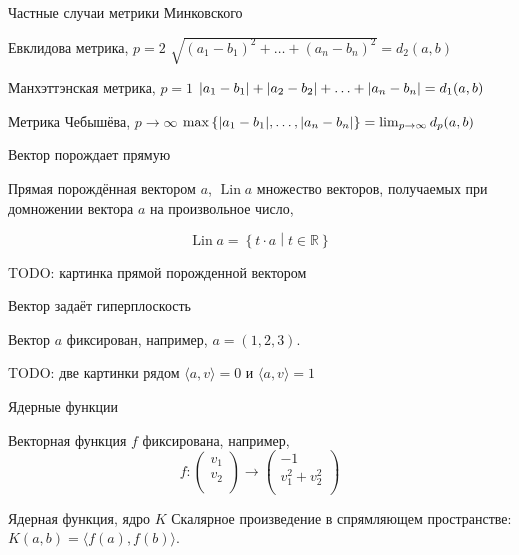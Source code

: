 \documentclass[14pt,xcolor=dvipsnames]{beamer}
\DeclareMathOperator{\Lin}{\mathrm{Lin}}
\newcommand\R{\mathbb{R}}
\begin{document}
\begin{frame}{Частные случаи метрики Минковского}

\begin{block}{Евклидова метрика, $p=2$}
$
  \sqrt{(a_1 - b_1)^2 + \ldots + (a_n - b_n)^2} = d_2(a, b)
$
\end{block}

\begin{block}{Манхэттэнская метрика, $p=1$}
$
    \abs{a_1 - b_1}  + \abs{a_2 - b_2} + \ldots + \abs{a_n - b_n} = d_1(a, b)
$
\end{block}
  
\begin{block}{Метрика Чебышёва, $p\to \infty$}
$
    \max\left\{\abs{a_1 - b_1}, \ldots, \abs{a_n - b_n}\right\} = \lim_{p\to\infty} d_p(a, b)
$
\end{block}
\end{frame}

\begin{frame}{Вектор порождает прямую}

\begin{block}{Прямая порождённая вектором $a$, $\Lin a$}
множество векторов, получаемых при домножении вектора $a$ на произвольное число,
\end{block}
\[
\Lin a = \left\{t\cdot a \middle| t \in \R \right\}  
\]

\begin{block}{TODO: картинка прямой порожденной вектором}
\end{block}

\end{frame}


\begin{frame}{Вектор задаёт гиперплоскость}

Вектор $a$ фиксирован, например, $a=(1, 2, 3)$.

\begin{block}{TODO: две картинки рядом}
$\langle a, v \rangle = 0$ и $\langle a, v \rangle = 1$   
\end{block}


\end{frame}


\begin{frame}{Ядерные функции}

Векторная функция $f$ фиксирована, например, 
\[
  f : \begin{pmatrix}
    v_1 \\
    v_2 \\
  \end{pmatrix} \to 
  \begin{pmatrix}
    -1 \\
    v_1^2 + v_2^2 \\
  \end{pmatrix}
\]

\begin{block}{Ядерная функция, ядро $K$}
Скалярное произведение в спрямляющем пространстве:
$K(a, b) = \langle f(a), f(b) \rangle$.
\end{block}
\end{frame}
\end{document}
